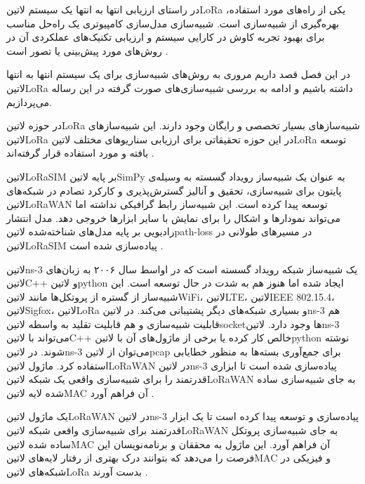 
در راستای ارزیابی انتها به انتها یک سیستم ‌لاتین{LoRa} یکی از راه‌های مورد استفاده،
بهره‌گیری از شبیه‌سازی است. شبیه‌سازی مدل‌سازی کامپیوتری یک راه‌حل مناسب برای بهبود تجربه
کاوش در کارایی سیستم و ارزیابی تکنیک‌های عملکردی آن در روش‌های مورد پیش‌بینی یا تصور است
.

در این فصل قصد داریم مروری به روش‌های شبیه‌سازی برای یک سیستم انتها به انتها
‌لاتین{LoRa} داشته باشیم و ادامه به بررسی شبیه‌سازی‌های صورت گرفته در این رساله می‌پردازیم.


در حوزه ‌لاتین{LoRa} شبیه‌سازهای بسیار تخصصی و رایگان وجود دارند.
این شبیه‌سازهای ‌لاتین{LoRa} در این حوزه تحقیقاتی برای ارزیابی سناریوهای مختلف ‌لاتین{LoRa}
توسعه یافته و مورد استفاده قرار گرفته‌اند
.


‌لاتین{LoRaSIM} بر پایه ‌لاتین{SimPy} به عنوان یک شبیه‌ساز رویداد گسسته به وسیله‌ی پایتون برای
شبیه‌سازی، تحقیق و آنالیز گسترش‌پذیری و کارکرد تصادم در شبکه‌های ‌لاتین{LoRaWAN} توسعه پیدا کرده است.
این شبیه‌ساز رابط گرافیکی نداشته اما می‌تواند نمودارها و اشکال را برای نمایش با سایر ابزارها خروجی دهد.
مدل انتشار رادیویی بر پایه مدل‌های شناخته‌شده ‌لاتین{path-loss} در مسیرهای طولانی در ‌لاتین{LoRaSIM}
پیاده‌سازی شده است
.


‌لاتین{ns-3} یک شبیه‌ساز شبکه رویداد گسسته است که در اواسط سال ۲۰۰۶
به زبان‌های ‌لاتین{C++} و ‌لاتین{python} ایجاد شده اما هنوز هم به شدت در حال توسعه است.
این شبیه‌ساز از گستره از پروتکل‌ها مانند ‌لاتین{WiFi}، ‌لاتین{LTE}، ‌لاتین{IEEE 802.15.4}،
‌لاتین{Sigfox}، ‌لاتین{LoRa} و بسیاری شبکه‌های دیگر پشتیبانی می‌کند.
در ‌لاتین{ns-3} هم قابلیت شبیه‌سازی و هم قابلیت تقلید به واسطه ‌لاتین{socket}ها وجود دارد.
‌لاتین{ns-3} می‌تواند با ‌لاتین{C++} خالص کار کرده یا برخی از ماژول‌های آن با ‌لاتین{python}
نوشته شوند.
در ‌لاتین{ns-3} می‌توان از ‌لاتین{pcap} برای جمع‌آوری بسته‌ها به منظور خطایابی استفاده کرد.
ماژول ‌لاتین{LoRaWAN} در  لاتین{ns-3} پیاده‌سازی شده است تا ابزاری قدرتمند را برای
شبیه‌سازی واقعی یک شبکه ‌لاتین{LoRaWAN} به جای شبیه‌سازی ساده شده لایه ‌لاتین{MAC} آن
فراهم آورد
.

یک ماژول ‌لاتین{LoRaWAN} در ‌لاتین{ns-3} پیاده‌سازی و توسعه پیدا کرده است تا یک ابزار قدرتمند
برای شبیه‌سازی واقعی شبکه ‌لاتین{LoRaWAN} به جای شبیه‌سازی پروتکل ساده شده ‌لاتین{MAC} آن
فراهم آورد.
این ماژول به محققان و برنامه‌نویسان این فرصت را می‌دهد که بتوانند درک بهتری از رفتار لایه‌های ‌لاتین{MAC}
و فیزیکی در شبکه‌های ‌لاتین{LoRa} بدست آورند
.

